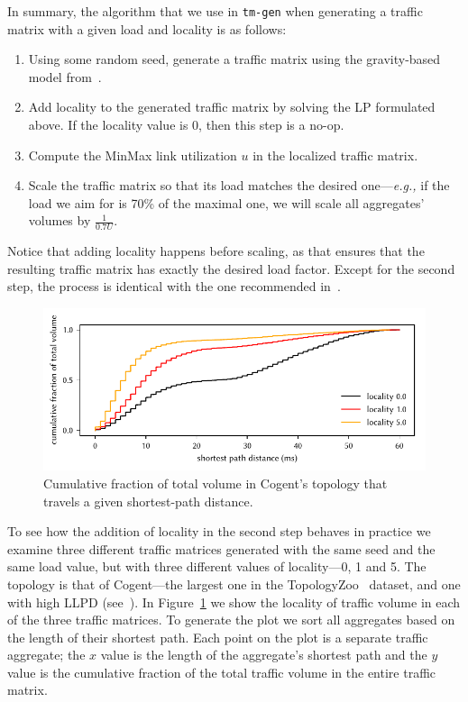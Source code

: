 \documentclass[12pt, letterpaper]{article}
\begin{document}
In summary, the algorithm that we use in \verb|tm-gen| when generating a
traffic matrix with a given load and locality is as follows:

\begin{enumerate}
  \item Using some random seed, generate a traffic matrix using the
    gravity-based model from~\cite{tm-synthesis-ccr05}.

  \item Add locality to the generated traffic matrix by solving the LP
    formulated above. If the locality value is 0, then this step is a
    no-op.
    
  \item Compute the MinMax link utilization $u$ in the localized
    traffic matrix.
    
  \item Scale the traffic matrix so that its load matches the desired
    one---{\em e.g.,} if the load we aim for is 70\% of the maximal
    one, we will scale all aggregates' volumes by $\frac{1}{0.7 U}$.

\end{enumerate}

Notice that adding locality happens before scaling, as that ensures
that the resulting traffic matrix has exactly the desired load
factor. Except for the second step, the process is identical with the
one recommended in~\cite{haddadi2013recent}.

\begin{figure}[t]
  \centering
  \includegraphics{tm_gen_cumulative_demands}
  \caption{Cumulative fraction of total volume in Cogent's topology
    that travels a given shortest-path distance.}
  \label{fig:tm-gen-cumulative}
\end{figure}

To see how the addition of locality in the second step behaves in
practice we examine three different traffic matrices generated with
the same seed and the same load value, but with three different values
of locality---0, 1 and 5. The topology is that of Cogent---the largest
one in the TopologyZoo~\cite{zoo} dataset, and one with high LLPD
(see~\cite{gvozdiev2018low}). In Figure~\ref{fig:tm-gen-cumulative} we
show the locality of traffic volume in each of the three traffic
matrices. To generate the plot we sort all aggregates based on the
length of their shortest path. Each point on the plot is a separate
traffic aggregate; the $x$ value is the length of the aggregate's
shortest path and the $y$ value is the cumulative fraction of the
total traffic volume in the entire traffic matrix.
\end{document}
